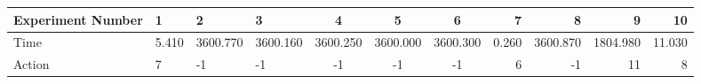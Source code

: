 \documentclass[8pt]{article}
\begin{document}
\begin{landscape}
\begin{tabular}{ | l | l | l | l | c | c | c | r | r | r | r | }
 \hline 
Experiment Number & 1 & 2 & 3 & 4 & 5 & 6 & 7 & 8 & 9 & 10\\ \hline
Time & 5.410 & 3600.770 & 3600.160 & 3600.250 & 3600.000 & 3600.300 & 0.260 & 3600.870 & 1804.980 & 11.030\\ \hline
Action & 7 & -1 & -1 & -1 & -1 & -1 & 6 & -1 & 11 & 8\\ \hline\end{tabular}
\end{landscape}
\end{document}
